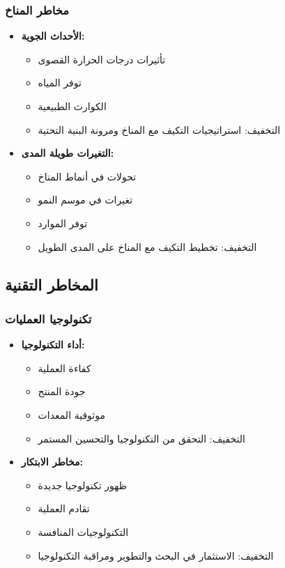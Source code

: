\subsubsection{مخاطر المناخ}
\begin{itemize}
    \item \textbf{الأحداث الجوية:}
    \begin{itemize}
        \item تأثيرات درجات الحرارة القصوى
        \item توفر المياه
        \item الكوارث الطبيعية
        \item التخفيف: استراتيجيات التكيف مع المناخ ومرونة البنية التحتية
    \end{itemize}
    
    \item \textbf{التغيرات طويلة المدى:}
    \begin{itemize}
        \item تحولات في أنماط المناخ
        \item تغيرات في موسم النمو
        \item توفر الموارد
        \item التخفيف: تخطيط التكيف مع المناخ على المدى الطويل
    \end{itemize}
\end{itemize}

\subsection{المخاطر التقنية}

\subsubsection{تكنولوجيا العمليات}
\begin{itemize}
    \item \textbf{أداء التكنولوجيا:}
    \begin{itemize}
        \item كفاءة العملية
        \item جودة المنتج
        \item موثوقية المعدات
        \item التخفيف: التحقق من التكنولوجيا والتحسين المستمر
    \end{itemize}
    
    \item \textbf{مخاطر الابتكار:}
    \begin{itemize}
        \item ظهور تكنولوجيا جديدة
        \item تقادم العملية
        \item التكنولوجيات المنافسة
        \item التخفيف: الاستثمار في البحث والتطوير ومراقبة التكنولوجيا
    \end{itemize}
\end{itemize}

